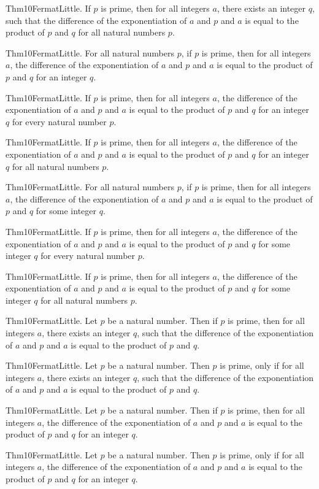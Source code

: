 \documentclass{article}
\begin{document}
Thm10FermatLittle. If $p$ is prime, then for all integers $a$, there exists an integer $q$, such that the difference of the exponentiation of $a$ and $p$ and $a$ is equal to the product of $p$ and $q$ for all natural numbers $p$.

Thm10FermatLittle. For all natural numbers $p$, if $p$ is prime, then for all integers $a$, the difference of the exponentiation of $a$ and $p$ and $a$ is equal to the product of $p$ and $q$ for an integer $q$.

Thm10FermatLittle. If $p$ is prime, then for all integers $a$, the difference of the exponentiation of $a$ and $p$ and $a$ is equal to the product of $p$ and $q$ for an integer $q$ for every natural number $p$.

Thm10FermatLittle. If $p$ is prime, then for all integers $a$, the difference of the exponentiation of $a$ and $p$ and $a$ is equal to the product of $p$ and $q$ for an integer $q$ for all natural numbers $p$.

Thm10FermatLittle. For all natural numbers $p$, if $p$ is prime, then for all integers $a$, the difference of the exponentiation of $a$ and $p$ and $a$ is equal to the product of $p$ and $q$ for some integer $q$.

Thm10FermatLittle. If $p$ is prime, then for all integers $a$, the difference of the exponentiation of $a$ and $p$ and $a$ is equal to the product of $p$ and $q$ for some integer $q$ for every natural number $p$.

Thm10FermatLittle. If $p$ is prime, then for all integers $a$, the difference of the exponentiation of $a$ and $p$ and $a$ is equal to the product of $p$ and $q$ for some integer $q$ for all natural numbers $p$.

Thm10FermatLittle. Let $p$ be a natural number. Then if $p$ is prime, then for all integers $a$, there exists an integer $q$, such that the difference of the exponentiation of $a$ and $p$ and $a$ is equal to the product of $p$ and $q$.

Thm10FermatLittle. Let $p$ be a natural number. Then $p$ is prime, only if for all integers $a$, there exists an integer $q$, such that the difference of the exponentiation of $a$ and $p$ and $a$ is equal to the product of $p$ and $q$.

Thm10FermatLittle. Let $p$ be a natural number. Then if $p$ is prime, then for all integers $a$, the difference of the exponentiation of $a$ and $p$ and $a$ is equal to the product of $p$ and $q$ for an integer $q$.

Thm10FermatLittle. Let $p$ be a natural number. Then $p$ is prime, only if for all integers $a$, the difference of the exponentiation of $a$ and $p$ and $a$ is equal to the product of $p$ and $q$ for an integer $q$.
\end{document}
